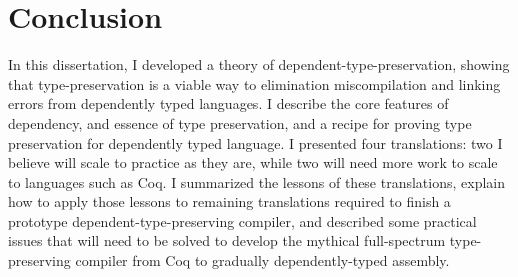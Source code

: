 \section{Conclusion}
In this dissertation, I developed a theory of dependent-type-preservation,
showing that type-preservation is a viable way to elimination miscompilation and
linking errors from dependently typed languages.
I describe the core features of dependency, and essence of type preservation,
and a recipe for proving type preservation for dependently typed language.
I presented four translations: two I believe will scale to practice as they are,
while two will need more work to scale to languages such as Coq.
I summarized the lessons of these translations, explain how to apply those
lessons to remaining translations required to finish a prototype
dependent-type-preserving compiler, and described some practical issues
that will need to be solved to develop the mythical full-spectrum
type-preserving compiler from Coq to gradually dependently-typed assembly.
